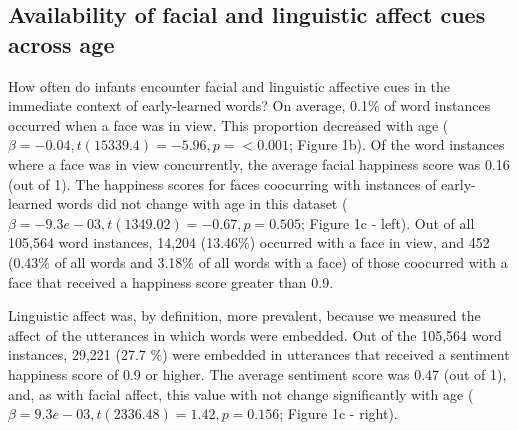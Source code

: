 \documentclass[10pt, letterpaper]{article}
\begin{document}
\subsection{Availability of facial and linguistic affect cues across
age}\label{availability-of-facial-and-linguistic-affect-cues-across-age}

How often do infants encounter facial and linguistic affective cues in
the immediate context of early-learned words? On average, 0.1\% of word
instances occurred when a face was in view. This proportion decreased
with age
(\(\beta = -0.04, \textit{t}(15339.4) = -5.96, \textit{p} = < 0.001\);
Figure 1b). Of the word instances where a face was in view concurrently,
the average facial happiness score was 0.16 (out of 1). The happiness
scores for faces coocurring with instances of early-learned words did
not change with age in this dataset
(\(\beta = -9.3e-03, \textit{t}(1349.02) = -0.67, \textit{p} = 0.505\);
Figure 1c - left). Out of all 105,564 word instances, 14,204 (13.46\%)
occurred with a face in view, and 452 (0.43\% of all words and 3.18\% of
all words with a face) of those coocurred with a face that received a
happiness score greater than 0.9.

Linguistic affect was, by definition, more prevalent, because we
measured the affect of the utterances in which words were embedded. Out
of the 105,564 word instances, 29,221 (27.7 \%) were embedded in
utterances that received a sentiment happiness score of 0.9 or higher.
The average sentiment score was 0.47 (out of 1), and, as with facial
affect, this value with not change significantly with age
(\(\beta = 9.3e-03, \textit{t}(2336.48) = 1.42, \textit{p} = 0.156\);
Figure 1c - right).
\end{document}
